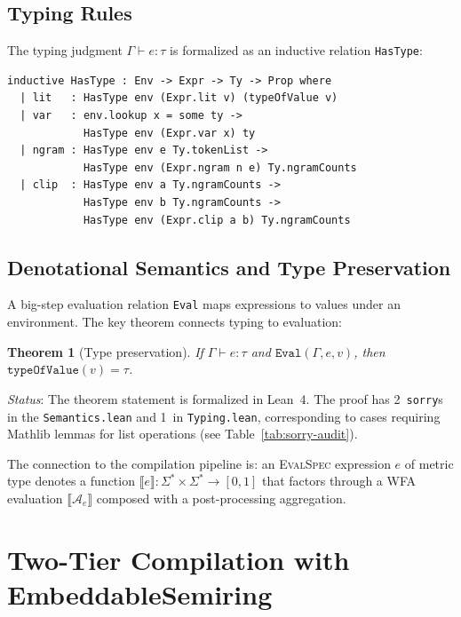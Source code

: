 \documentclass[11pt]{article}
\newtheorem{theorem}{Theorem}[section]
\newcommand{\evalspec}{\textsc{EvalSpec}}
\newcommand{\wfa}{\mathcal{A}}
\newcommand{\sorry}{\texttt{sorry}}
\begin{document}
\subsection{Typing Rules}

The typing judgment $\Gamma \vdash e : \tau$ is formalized as an
inductive relation \texttt{HasType}:

\begin{lstlisting}[language=Lean4,caption={Typing rules (excerpt).}]
inductive HasType : Env -> Expr -> Ty -> Prop where
  | lit   : HasType env (Expr.lit v) (typeOfValue v)
  | var   : env.lookup x = some ty ->
            HasType env (Expr.var x) ty
  | ngram : HasType env e Ty.tokenList ->
            HasType env (Expr.ngram n e) Ty.ngramCounts
  | clip  : HasType env a Ty.ngramCounts ->
            HasType env b Ty.ngramCounts ->
            HasType env (Expr.clip a b) Ty.ngramCounts
\end{lstlisting}

\subsection{Denotational Semantics and Type Preservation}

A big-step evaluation relation \texttt{Eval} maps expressions to
values under an environment.
The key theorem connects typing to evaluation:

\begin{theorem}[Type preservation]\label{thm:type-preservation}
If\/ $\Gamma \vdash e : \tau$ and $\texttt{Eval}(\Gamma, e, v)$, then
$\texttt{typeOfValue}(v) = \tau$.
\end{theorem}

\emph{Status}: The theorem statement is formalized in Lean~4.
The proof has 2~\sorry{}s in the \texttt{Semantics.lean} and
1~in \texttt{Typing.lean}, corresponding to cases requiring
Mathlib lemmas for list operations (see Table~\ref{tab:sorry-audit}).

The connection to the compilation pipeline is: an \evalspec{}
expression $e$ of metric type denotes a function
$\llbracket e \rrbracket : \Sigma^* \times \Sigma^* \to [0,1]$
that factors through a WFA evaluation
$\llbracket \wfa_e \rrbracket$ composed with a post-processing
aggregation.


\section{Two-Tier Compilation with EmbeddableSemiring}\label{sec:compilation}
\end{document}
